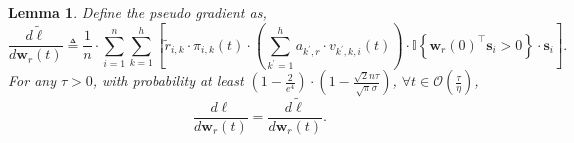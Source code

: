 \documentclass[10pt]{article}
\def\rvs{{\mathbf{s}}}
\def\rvw{{\mathbf{w}}}
\newtheorem{lem}{Lemma}
\def\sI{{\mathbb{I}}}
\begin{document}
\begin{lem}
\label{lem:gradient_upper_bound}
	Define the pseudo gradient as,
\begin{equation*}
	\frac{d \tilde{\ell}}{d \rvw_r(t)} \triangleq \frac{1}{n} \cdot \sum\limits_{i=1}^{n}{ \sum\limits_{k=1}^{h}{ \left[ \tilde{r}_{i,k} \cdot \pi_{i,k}(t) \cdot \left( \sum\limits_{k^\prime = 1}^{h}{ a_{k^\prime,r}  \cdot v_{k^\prime,k,i}(t) } \right) \cdot \sI\left\{ \rvw_r(0)^\top \rvs_i > 0 \right\} \cdot \rvs_i \right] } }.
\end{equation*}
	For any $\tau > 0$, with probability at least $\left( 1 - \frac{2}{e^4} \right) \cdot \left( 1 - \frac{\sqrt{2}n\tau}{\sqrt{\pi}\sigma} \right)$, $\forall t \in \mathcal{O}\left(\frac{\tau}{\eta}\right)$,
\begin{equation}
	\frac{d\ell}{d \rvw_r(t)} = \frac{d \tilde{\ell}}{d \rvw_r(t)}.
\end{equation}
\end{lem}
\end{document}

